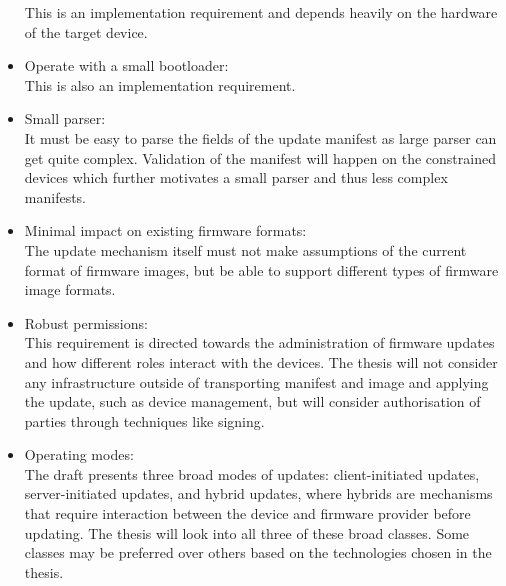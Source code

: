 \documentclass[0-thesis.tex]{subfiles}
\begin{document}
\begin{itemize}
            This is an implementation requirement and depends heavily on the hardware of
            the target device. %
    \item Operate with a small bootloader:\\
            This is also an implementation requirement. %
    \item Small parser:\\
            It must be easy to parse the fields of the update manifest as large parser can
            get quite complex. Validation of the manifest will happen on the constrained
            devices which further motivates a small parser and thus less complex
            manifests.
    \item Minimal impact on existing firmware formats:\\
            The update mechanism itself must not make assumptions of the current format of
            firmware images, but be able to support different types of firmware image
            formats.
    \item Robust permissions:\\
            This requirement is directed towards the administration of firmware updates
            and how different roles interact with the devices. The thesis will not
            consider any infrastructure outside of transporting manifest and image and
            applying the update, such as device management, but will consider
            authorisation of parties through techniques like signing.
    \item Operating modes:\\
            The draft presents three broad modes of updates: client-initiated updates,
            server-initiated updates, and hybrid updates, where hybrids are mechanisms
            that require interaction between the device and firmware provider before
            updating. The thesis will look into all three of these broad classes. Some
            classes may be preferred over others based on the technologies chosen in the
            thesis.
\end{itemize}

\end{document}
